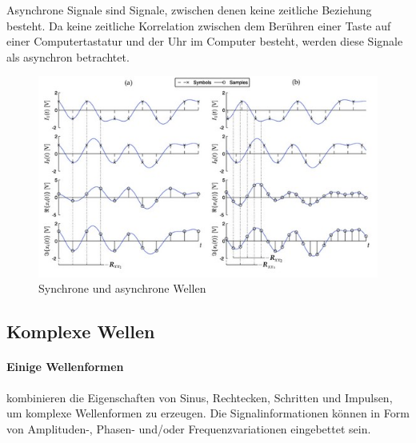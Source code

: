 \documentclass{article}
\begin{document}
Asynchrone Signale sind Signale, zwischen denen keine zeitliche Beziehung besteht. Da keine zeitliche Korrelation zwischen dem Berühren einer Taste auf einer Computertastatur und der Uhr im Computer besteht, werden diese Signale als asynchron betrachtet.\cite{basics}
\begin{figure}[H]
  \includegraphics[width=\textwidth]{"SyncAsyncWave"}
  \caption[\textbf{SyncAsyncWave.jpg},  Quelle:https://www.researchgate.net/figure/Comparison-between-synchronous-a-and-asynchronous-b-signal-modeling-and-illustration_fig1_304556001 (zuletzt abgerufen: 04.09.2021)]{Synchrone und asynchrone Wellen}
\end{figure}
\newline
\subsection{Komplexe Wellen}
\paragraph{Einige Wellenformen}
 kombinieren die Eigenschaften von Sinus, Rechtecken, Schritten und Impulsen, um komplexe Wellenformen zu erzeugen. Die Signalinformationen können in Form von Amplituden-, Phasen- und/oder Frequenzvariationen eingebettet sein.\cite{basics}
\end{document}

